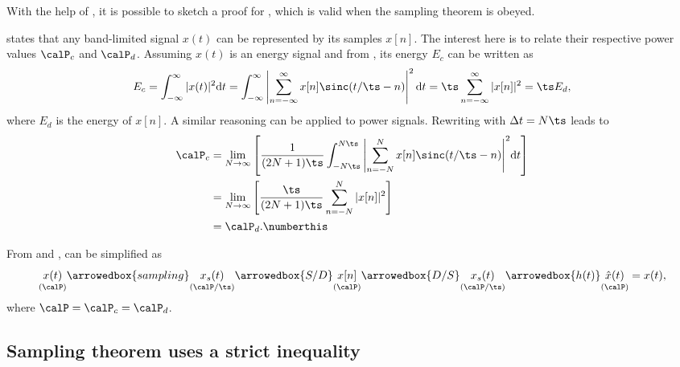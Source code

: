 With the help of , it is possible to sketch a proof for , which is valid when the sampling theorem is obeyed. 

 states that any band-limited signal $x(t)$ can be represented by its samples $x[n]$. The interest here is to relate their respective power values $\calP_c$ and $\calP_d$. Assuming $x(t)$ is an energy signal and from , its energy $E_c$ can be written as
\begin{equation}
E_c = \int_{-\infty}^{\infty} |x(t)|^2 \textrm{d}t = \int_{-\infty}^{\infty} \left|\sum_{n=-\infty}^\infty x[n] \sinc(t/\ts-n) \right|^2 \textrm{d}t = \ts \sum_{n=-\infty}^\infty |x[n]|^2 = \ts E_d,
\label{eq:energy_discretetime}
\end{equation}
where $E_d$ is the energy of $x[n]$. 
A similar reasoning can be applied to power signals. Rewriting  with $\Delta t = N \ts$ leads to
\begin{align*}
\calP_c &= \lim_{N \rightarrow \infty} \left[ \frac{1}{(2N+1)\ts} \int_{-N \ts}^{N \ts}{\left|\sum_{n=-N}^N x[n] \sinc(t/\ts-n) \right|^2}\textrm{d}t \right] \\
 &= \lim_{N \rightarrow \infty} \left[ \frac{\ts}{(2N+1)\ts} \sum_{n=-N }^{N }{|x[n]|^2} \right] \\
 &= \calP_d. \numberthis
\label{eq:powerRelationProved}
\end{align*} %


From  and , 
 can be simplified as 
\begin{equation}
\underset{(\calP)}{x(t)} \arrowedbox{sampling} \underset{(\calP/\ts)}{x_s(t)} \arrowedbox{S/D} \underset{(\calP)}{x[n]} \arrowedbox{D/S} \underset{(\calP/\ts)}{x_s(t)} \arrowedbox{h(t)} \underset{(\calP)}{\hat x(t)}  = x(t),
\label{eq:samplingAndReconstructionSimplified}
\end{equation}
where $\calP = \calP_c = \calP_d$.

\subsection{Sampling theorem uses a strict inequality}

